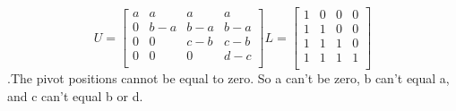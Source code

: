 \documentclass {article}
\begin{document}
$$
U = 
\begin{bmatrix}
a & a & a & a \\
0 & b-a & b-a & b-a  \\
0 & 0 & c-b & c-b \\
0 & 0 & 0 & d-c \\
\end{bmatrix}
L=
\begin{bmatrix}
1 & 0 & 0 & 0 \\
1 & 1 & 0 & 0 \\
1 & 1 & 1 & 0 \\
1 & 1 & 1 & 1 \\
\end{bmatrix}
$$
.The pivot positions cannot be equal to zero. So a can't be zero, b can't equal a, and c can't equal b or d.
\end{document}
